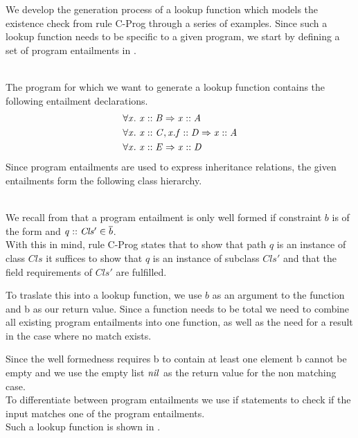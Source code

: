 We develop the generation process of a lookup function which models
the existence check from rule C-Prog through a series of examples.
Since such a lookup function needs to be specific to a given program,
we start by defining a set of program entailments in .
%
\begin{example}\quad\\
\label{ex:progent-inheritance}
The program for which we want to generate a lookup function
contains the following entailment declarations.
\begin{align*}
& \forall \mathit{x}.\ \mathit{\mathit{x} :: \mathit{B}} \Rightarrow \mathit{\mathit{x} :: \mathit{A}}\\
& \forall \mathit{x}.\ \mathit{\mathit{x} :: \mathit{C}, \mathit{x.f} :: \mathit{D}} \Rightarrow \mathit{\mathit{x} :: \mathit{A}}\\
& \forall \mathit{x}.\ \mathit{\mathit{x} :: \mathit{E}} \Rightarrow \mathit{\mathit{x} :: \mathit{D}}
\end{align*}
Since program entailments are used to express inheritance relations,
the given entailments form the following class hierarchy.
\begin{center}
\end{center}
\end{example}\quad\\
We recall from  that a program entailment 
is only well formed if constraint $b$ is
of the form  and $\mathit{q} :: \mathit{Cls'} \in \overline{b}$.\\
With this in mind, rule C-Prog states that to show that
path $q$ is an instance of class $Cls$ it suffices to show
that $q$ is an instance of subclass $Cls'$
and that the field requirements of $Cls'$ are fulfilled.

To traslate this into a lookup function,
we use $b$ as an argument to the function and \ovl b as our return value.
Since a function needs to be total we need to combine all
existing program entailments into one function,
as well as the need for a result in the case where no match exists.

Since the well formedness requires \ovl b to contain at least
one element \ovl b cannot be empty and we use the
empty list $\mathit{nil}$ as the return value for the non matching case.\\
To differentiate between program entailments we use if statements
to check if the input matches one of the program entailments.\\
Such a lookup function is shown in .

